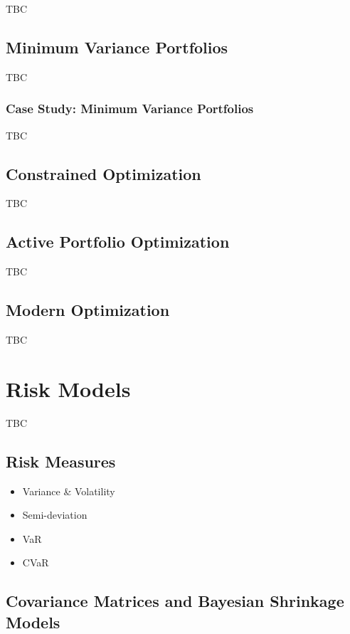 \documentclass[]{book}
\providecommand{\tightlist}{%
  \setlength{\itemsep}{0pt}\setlength{\parskip}{0pt}}
\theoremstyle{definition}
\theoremstyle{definition}
\theoremstyle{definition}
\theoremstyle{remark}
\begin{document}
TBC

\section{Minimum Variance Portfolios}\label{minimum-variance-portfolios}

TBC

\subsection{Case Study: Minimum Variance
Portfolios}\label{case-study-minimum-variance-portfolios}

TBC

\section{Constrained Optimization}\label{constrained-optimization}

TBC

\section{Active Portfolio
Optimization}\label{active-portfolio-optimization}

TBC

\section{Modern Optimization}\label{modern-optimization}

TBC

\chapter{Risk Models}\label{risk}

TBC

\section{Risk Measures}\label{risk-measures}

\begin{itemize}
\tightlist
\item
  Variance \& Volatility
\item
  Semi-deviation
\item
  VaR
\item
  CVaR
\end{itemize}

\section{Covariance Matrices and Bayesian Shrinkage
Models}\label{covariance-matrices-and-bayesian-shrinkage-models}
\end{document}
